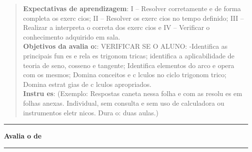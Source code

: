 \documentclass{article}
\begin{document}

\begin{quote}
\begin{scriptsize}
\textbf{Expectativas de aprendizagem}: %
 I -- Resolver corretamente e de forma completa os exerc cios; II -- Resolver os exerc cios no tempo definido; III -- Realizar a interpreta o correta dos exerc cios e IV -- Verificar o conhecimento adquirido em sala.\\
\textbf{Objetivos da avalia o:}:   VERIFICAR SE O ALUNO: -Identifica as principais fun es e rela es trigonom tricas;  identifica a aplicabilidade de teoria de seno, cosseno e tangente;  Identifica elementos do arco e opera com os mesmos;  Domina conceitos e c lculos no ciclo trigonom trico; Domina estrat gias de c lculos apropriados.\\
\textbf{Instru es}:  (Exemplo: Respostas   caneta nessa folha e com as resolu es em folhas anexas. Individual, sem consulta e sem uso de calculadora ou instrumentos eletr nicos. Dura o: duas aulas.)
\end{scriptsize}
\end{quote}

\hrule
\begin{center}
\begin{large}
\bf Avalia o de \disciplina \\
\end{large}
\end{center}
\hrule


\end{document}
